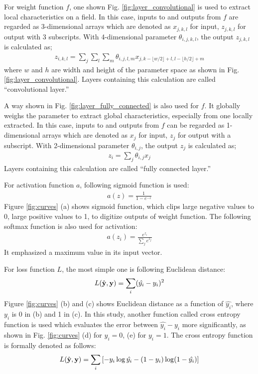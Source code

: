 \documentclass[twocolumn]{article}
\begin{document}
For weight function $f$, one shown Fig. \ref{fig:layer_convolutional}
is used to extract local characteristics on a field.
In this case, inputs to and outputs from $f$ are regarded as
3-dimensional arrays which are denoted as $x_{j,k,l}$ for input,
$z_{j,k,l}$ for output with 3 subscripts.
With 4-dimensional parameter $\theta_{i,j,k,l}$,
the output $z_{j,k,l}$ is calculated as;
\begin{eqnarray}
z_{i,k,l} = \sum_{j}\sum_{l}\sum_{m}
\theta_{i,j,l,m} x_{j,k - \lfloor w/2 \rfloor + l,l - \lfloor h/2 \rfloor + m}
\end{eqnarray}
where $w$ and $h$ are width and height of the parameter space
as shown in Fig. \ref{fig:layer_convolutional}.
Layers containing this calculation are called ``convolutional layer.''

A way shown in Fig. \ref{fig:layer_fully_connected} is also used for $f$.
It globally weighs the parameter to extract global characteristics,
especially from one locally extracted.
In this case, inputs to and outputs from $f$ can be regarded as
1-dimensional arrays which are denoted as $x_j$ for input,
$z_j$ for output with a subscript.
With 2-dimensional parameter $\theta_{i,j}$,
the output $z_j$ is calculated as;
\begin{eqnarray}
z_i = \sum_{j} \theta_{i,j} x_{j}
\end{eqnarray}
Layers containing this calculation are called ``fully connected layer.''

For activation function $a$, following sigmoid function is used:
\begin{eqnarray}
a(z) = \frac{1}{1-e^{-z}}
\end{eqnarray}
Figure \ref{fig:curves} (a) shows sigmoid function,
which clips large negative values to 0, large positive values to 1,
to digitize outputs of weight function.
The following softmax function is also used for activation:
\begin{eqnarray}
a(z_i) = \frac{e^{z_i}}{\sum_j e^{z_j}}
\end{eqnarray}
It emphasized a maximum value in its input vector.

For loss function $L$, the most simple one is following Euclidean distance:
\begin{eqnarray}
L(\hat{\bf y}, {\bf y}) = \sum_{i}(\hat{y_i} - y_i)^2
\end{eqnarray}
Figure \ref{fig:curves} (b) and (c) shows Euclidean distance
as a function of $\hat{y_i}$, where $y_i$ is 0 in (b) and 1 in (c).
In this study, another function called cross entropy function is used
which evaluates the error between $\hat{y_i}-y_i$ more significantly,
as shown in Fig. \ref{fig:curves} (d) for $y_i = 0$, (e) for $y_i = 1$.
The cross entropy function is formally denoted as follows:
\begin{eqnarray}
L(\hat{\bf y}, {\bf y}) =
\sum_i \left[ - y_i \log \hat{y_i} - (1-y_i) \log (1-\hat{y_i}) \right]
\end{eqnarray}
\end{document}
